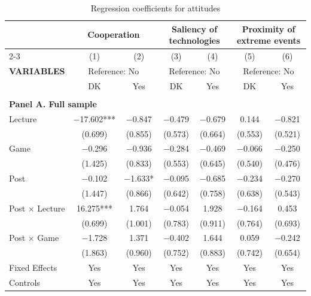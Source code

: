 \begin{table}[htbp]
\centering
\caption{Regression coefficients for attitudes}
\label{tab:attitudes_two_panel}
\fontsize{7pt}{8.4pt}\selectfont
\begin{tabular}{lcccccc}
\hline
\hline
\rule{0pt}{1.2em} & \multicolumn{2}{c}{\textbf{Cooperation}} & \multicolumn{2}{c}{\textbf{Saliency of technologies}} & \multicolumn{2}{c}{\textbf{Proximity of extreme events}} \\
\cline{2-3} \cline{4-5} \cline{6-7}
\rule{0pt}{1.2em} & (1) & (2) & (3) & (4) & (5) & (6) \\
\hline
\multicolumn{1}{l}{\textbf{VARIABLES}} & \multicolumn{2}{c}{Reference: No} & \multicolumn{2}{c}{Reference: No} & \multicolumn{2}{c}{Reference: No} \\
\rule{0pt}{1.1em} & DK & Yes & DK & Yes & DK & Yes \\
\hline
\\
\multicolumn{7}{l}{\textbf{Panel A. Full sample}} \\
\hline
Lecture & \num{-17.602}*** & \num{-0.847} & \num{-0.479} & \num{-0.679} & \num{0.144} & \num{-0.821} \\
 & (\num{0.699}) & (\num{0.855}) & (\num{0.573}) & (\num{0.664}) & (\num{0.553}) & (\num{0.521}) \\
Game & \num{-0.296} & \num{-0.936} & \num{-0.284} & \num{-0.469} & \num{-0.066} & \num{-0.250} \\
 & (\num{1.425}) & (\num{0.833}) & (\num{0.553}) & (\num{0.645}) & (\num{0.540}) & (\num{0.476}) \\
Post & \num{-0.102} & \num{-1.633}* & \num{-0.095} & \num{-0.685} & \num{-0.234} & \num{-0.270} \\
 & (\num{1.447}) & (\num{0.866}) & (\num{0.642}) & (\num{0.758}) & (\num{0.638}) & (\num{0.543}) \\
Post $\times$ Lecture & \num{16.275}*** & \num{1.764} & \num{-0.054} & \num{1.928} & \num{-0.164} & \num{0.453} \\
 & (\num{0.699}) & (\num{1.001}) & (\num{0.783}) & (\num{0.911}) & (\num{0.764}) & (\num{0.693}) \\
Post $\times$ Game & \num{-1.728} & \num{1.371} & \num{-0.402} & \num{1.644} & \num{0.059} & \num{-0.242} \\
 & (\num{1.863}) & (\num{0.960}) & (\num{0.752}) & (\num{0.883}) & (\num{0.742}) & (\num{0.654}) \\
\hline
Fixed Effects & Yes & Yes & Yes & Yes & Yes & Yes \\
Controls & Yes & Yes & Yes & Yes & Yes & Yes \\

\end{tabular}
\end{table}
